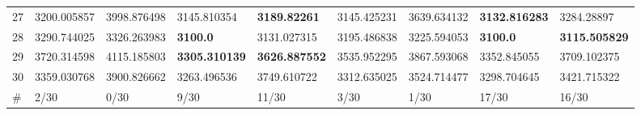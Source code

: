 \begin{table*}[t]
\begin{tabular}{|p{0.8cm}|p{1.6cm}|p{1.6cm}|p{1.6cm}|p{1.6cm}|p{1.6cm}|p{1.6cm}|p{1.6cm}|p{1.6cm}|}
27  & 3200.005857 & 3998.876498 & 3145.810354 & \textbf{3189.82261} & 3145.425231 & 3639.634132 & \textbf{3132.816283} & 3284.28897 \\ 
28  & 3290.744025 & 3326.263983 & \textbf{3100.0} & 3131.027315 & 3195.486838 & 3225.594053 & \textbf{3100.0} & \textbf{3115.505829} \\ 
29  & 3720.314598 & 4115.185803 & \textbf{3305.310139} & \textbf{3626.887552} & 3535.952295 & 3867.593068 & 3352.845055 & 3709.102375 \\ 
30  & 3359.030768 & 3900.826662 & 3263.496536 & 3749.610722 & 3312.635025 & 3524.714477 & 3298.704645 & 3421.715322 \\ 
\hline
\#  & 2/30 & 0/30 & 9/30 & 11/30 & 3/30 & 1/30 & 17/30 & 16/30 \\
\hline
\end{tabular}
\end{table*}
\endgroup


